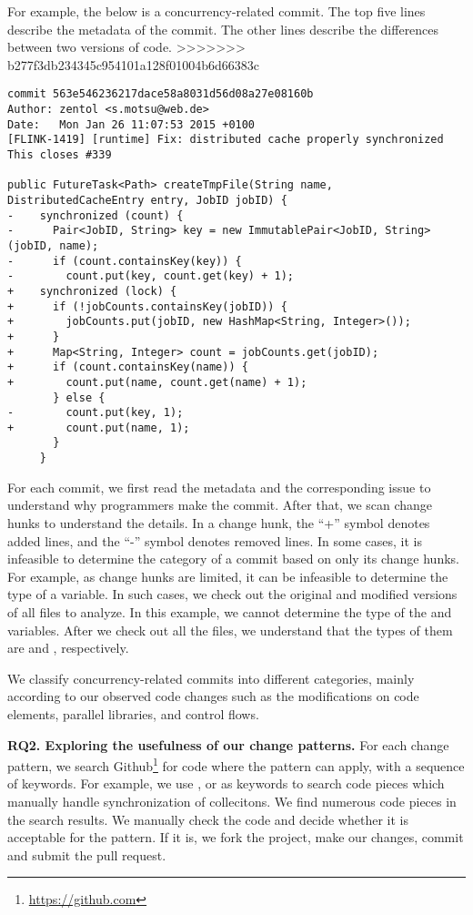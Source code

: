 For example, the below is a concurrency-related commit. The top five lines describe the metadata of the commit. The other lines describe the differences between two versions of code.
>>>>>>> b277f3db234345c954101a128f01004b6d66383c

\begin{lstlisting}
commit 563e546236217dace58a8031d56d08a27e08160b
Author: zentol <s.motsu@web.de>
Date:   Mon Jan 26 11:07:53 2015 +0100
[FLINK-1419] [runtime] Fix: distributed cache properly synchronized
This closes #339

public FutureTask<Path> createTmpFile(String name, DistributedCacheEntry entry, JobID jobID) {
-    synchronized (count) {
-      Pair<JobID, String> key = new ImmutablePair<JobID, String>(jobID, name);
-      if (count.containsKey(key)) {
-        count.put(key, count.get(key) + 1);
+    synchronized (lock) {
+      if (!jobCounts.containsKey(jobID)) {
+        jobCounts.put(jobID, new HashMap<String, Integer>());
+      }
+      Map<String, Integer> count = jobCounts.get(jobID);
+      if (count.containsKey(name)) {
+        count.put(name, count.get(name) + 1);
       } else {
-        count.put(key, 1);
+        count.put(name, 1);
       }
     }
\end{lstlisting}

For each commit, we first read the metadata and the corresponding issue to understand why programmers make the commit. After that, we scan change hunks to understand the details. In a change hunk, the ``+'' symbol denotes added lines, and the ``-'' symbol denotes removed lines. In some cases, it is infeasible to determine the category of a commit based on only its change hunks. For example, as change hunks are limited, it can be infeasible to determine the type of a variable. In such cases, we check out the original and modified versions of all files to analyze. In this example, we cannot determine the type of the  and  variables. After we check out all the files, we understand that the types of them are  and , respectively.

We classify concurrency-related commits into different categories, mainly according to our observed code changes such as the modifications on code elements, parallel libraries, and control flows.

\textbf{RQ2. Exploring the usefulness of our change patterns.} For each change pattern, we search Github\footnote{\url{https://github.com}} for code where the pattern can apply, with a sequence of keywords. For example, we use ,  or  as keywords to search code pieces which manually handle synchronization of collecitons. We find numerous code pieces in the search results. We manually check the code and decide whether it is acceptable for the pattern. If it is, we fork the project, make our changes, commit and submit the pull request. 

